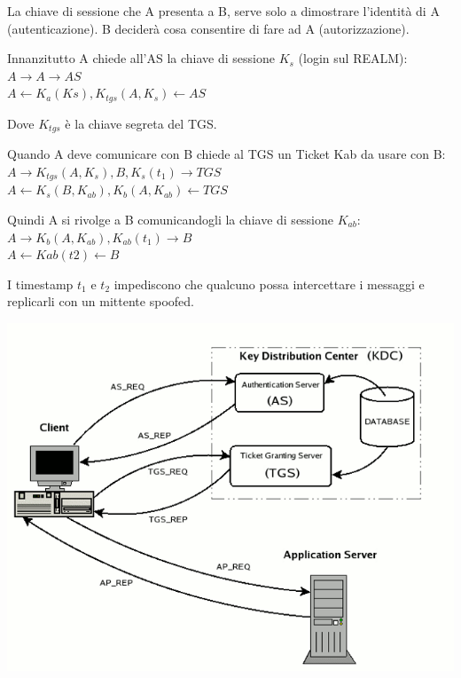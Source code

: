             La chiave di sessione che A presenta a B, serve solo a dimostrare l'identità di A (autenticazione). B deciderà cosa consentire di fare ad A (autorizzazione).

            Innanzitutto A chiede all'AS la chiave di sessione $K_s$ (login sul REALM):\\
            $A \rightarrow A \rightarrow AS$\\
            $A \leftarrow K_a(Ks), K_{tgs}(A,K_s) \leftarrow AS$

            Dove $K_{tgs}$ è la chiave segreta del TGS.

            Quando A deve comunicare con B chiede al TGS un Ticket Kab da usare con B:\\
            $A \rightarrow K_{tgs}(A,K_s), B, K_s(t_1) \rightarrow TGS$\\
            $A \leftarrow K_s(B,K_{ab}), K_b(A,K_{ab}) \leftarrow TGS$

            Quindi A si rivolge a B comunicandogli la chiave di sessione $K_{ab}$:\\
            $A \rightarrow K_b(A,K_{ab}), K_{ab}(t_1) \rightarrow B$\\
            $A \leftarrow Kab(t2) \leftarrow B$

            I timestamp $t_1$ e $t_2$ impediscono che qualcuno possa intercettare i messaggi e replicarli con un mittente spoofed.
        
            \begin{center}
                \includegraphics[scale=0.45]{chapters/7/assets/schema_zx.png}
            \end{center}

